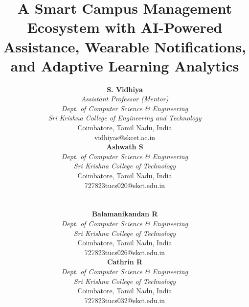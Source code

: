 \documentclass[conference]{IEEEtran}
\begin{document}
\title{A Smart Campus Management Ecosystem with AI-Powered Assistance, Wearable Notifications, and Adaptive Learning Analytics}

\author{
\begin{minipage}[t]{0.48\textwidth}
\centering
\textbf{S. Vidhiya} \\
\textit{Assistant Professor (Mentor)} \\
\textit{Dept. of Computer Science \& Engineering} \\
\textit{Sri Krishna College of Engineering and Technology}\\
Coimbatore, Tamil Nadu, India \\
vidhiyas@skcet.ac.in
\end{minipage}\hfill
\begin{minipage}[t]{0.48\textwidth}
\centering
\textbf{Ashwath S} \\
\textit{Dept. of Computer Science \& Engineering} \\
\textit{Sri Krishna College of Technology}\\
Coimbatore, Tamil Nadu, India \\
727823tucs020@skct.edu.in
\end{minipage}
\vspace{3ex}\\
\begin{minipage}[t]{0.48\textwidth}
\centering
\textbf{Balamanikandan R} \\
\textit{Dept. of Computer Science \& Engineering} \\
\textit{Sri Krishna College of Technology}\\
Coimbatore, Tamil Nadu, India \\
727823tucs026@skct.edu.in
\end{minipage}\hfill
\begin{minipage}[t]{0.48\textwidth}
\centering
\textbf{Cathrin R} \\
\textit{Dept. of Computer Science \& Engineering} \\
\textit{Sri Krishna College of Technology}\\
Coimbatore, Tamil Nadu, India \\
727823tucs032@skct.edu.in
\end{minipage}
}

\maketitle
\end{document}
